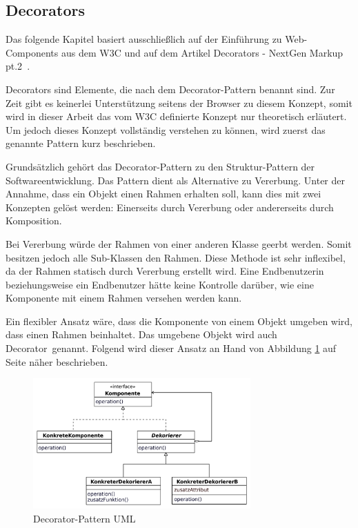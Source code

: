 \subsection{Decorators}
\label{sec:3_WC_Decorators}

Das folgende Kapitel basiert ausschließlich auf der Einführung zu Web-Components aus dem W3C \citereset \autocite[siehe][]{CooneyGlazkov.2013} und auf dem Artikel \glqq Decorators - NextGen Markup pt.2\grqq\ \citereset \autocite[siehe][]{PreventDefault.2013}.

Decorators sind Elemente, die nach dem Decorator-Pattern benannt sind. Zur Zeit gibt es keinerlei Unterstützung seitens der Browser zu diesem Konzept, somit wird in dieser Arbeit das vom W3C definierte Konzept nur theoretisch erläutert. Um jedoch dieses Konzept vollständig verstehen zu können, wird zuerst das genannte Pattern kurz beschrieben.

Grundsätzlich gehört das Decorator-Pattern zu den Struktur-Pattern der Softwareentwicklung. Das Pattern dient als Alternative zu Vererbung. Unter der Annahme, dass ein Objekt einen Rahmen erhalten soll, kann dies mit zwei Konzepten gelöst werden: Einerseits durch Vererbung oder andererseits durch Komposition.

Bei Vererbung würde der Rahmen von einer anderen Klasse geerbt werden. Somit besitzen jedoch alle Sub-Klassen den Rahmen. Diese Methode ist sehr inflexibel, da der Rahmen statisch durch Vererbung erstellt wird. Eine Endbenutzerin beziehungsweise ein Endbenutzer hätte keine Kontrolle darüber, wie eine Komponente mit einem Rahmen versehen werden kann.

Ein flexibler Ansatz wäre, dass die Komponente von einem Objekt umgeben wird, dass einen Rahmen beinhaltet. Das umgebene Objekt wird auch \glqq Decorator\grqq\ genannt. Folgend wird dieser Ansatz an Hand von Abbildung \ref{fig:3_Decorator_UML} auf Seite \pageref{fig:3_Decorator_UML} näher beschrieben.

\begin{figure}[h]
\centering
\includegraphics[height=5.0cm]{images/decorator.png}
\caption[
Decorator-Pattern UML
]{Decorator-Pattern UML \citereset \autocite[siehe][S. 196-200]{Gamma.1995}}
\label{fig:3_Decorator_UML}
\end{figure}

